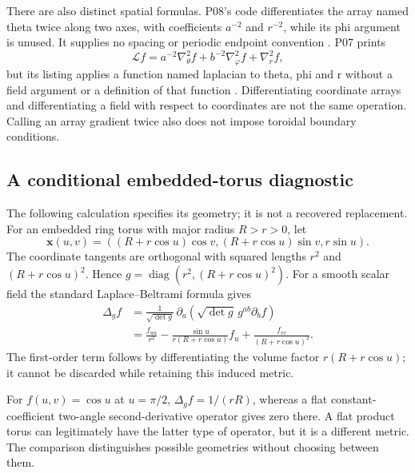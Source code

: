 \documentclass[11pt,a4paper]{article}
\theoremstyle{definition}
\numberwithin{equation}{section}
\begin{document}
There are also distinct spatial formulas. P08's code differentiates the
array named theta twice along two axes, with coefficients $a^{-2}$ and
$r^{-2}$, while its phi argument is unused. It supplies no spacing or
periodic endpoint convention \cite[physical p.~2, \S2.3]{P08}.
P07 prints
\begin{equation}
 \mathcal L f
 =a^{-2}\nabla_\theta^2f+
 b^{-2}\nabla_\varphi^2f+\nabla_r^2f,
 \label{eq:p07-spatial}
\end{equation}
but its listing applies a function named laplacian to theta, phi and r
without a field argument or a definition of that function
\cite[physical p.~4, \S2.2]{P07}.
Differentiating coordinate arrays and differentiating a field with respect
to coordinates are not the same operation. Calling an array gradient
twice also does not impose toroidal boundary conditions.

\subsection{A conditional embedded-torus diagnostic}
\label{sec:torus}

The following calculation specifies its geometry; it is not a recovered
replacement. For an embedded ring torus with major radius $R>r>0$, let
\begin{equation}
 \mathbf x(u,v)=
 ((R+r\cos u)\cos v,(R+r\cos u)\sin v,r\sin u).
 \label{eq:torus-embedding}
\end{equation}
The coordinate tangents are orthogonal with squared lengths
$r^2$ and $(R+r\cos u)^2$. Hence
$g=\operatorname{diag}(r^2,(R+r\cos u)^2)$.
For a smooth scalar field the standard Laplace--Beltrami formula gives
\begin{align}
 \Delta_g f
 &=\frac1{\sqrt{\det g}}\,
   \partial_a\!\left(\sqrt{\det g}\,g^{ab}\partial_bf\right)\nonumber\\
 &=\frac{f_{uu}}{r^2}
   -\frac{\sin u}{r(R+r\cos u)}f_u
   +\frac{f_{vv}}{(R+r\cos u)^2}.
 \label{eq:torus-lb}
\end{align}
The first-order term follows by differentiating the volume factor
$r(R+r\cos u)$; it cannot be discarded while retaining this induced metric.

For $f(u,v)=\cos u$ at $u=\pi/2$,
$\Delta_g f=1/(rR)$, whereas a flat constant-coefficient two-angle
second-derivative operator gives zero there. A flat product torus can
legitimately have the latter type of operator, but it is a different metric.
The comparison distinguishes possible geometries without choosing between
them.
\end{document}
